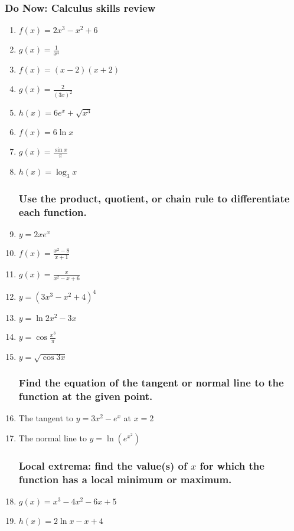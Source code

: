 \documentclass[12pt, twoside]{article}
\begin{document}
\subsubsection*{Do Now: Calculus skills review}

\begin{enumerate}

\subsubsection*{Differentiate each function.}

  \item $f(x)=2x^3-x^2+6$
  \item $g(x) = \frac{1}{x^4}$
  \item $f(x)=(x-2)(x+2)$
  \item $g(x)=\frac{2}{(3x)^2}$
  \item $h(x)=6e^x+\sqrt{x^3}$
  \item $f(x)=6\ln{x}$
  \item $g(x) = \displaystyle \frac{\sin x}{\pi}$
  \item $h(x)= \log_3{x}$

\subsubsection*{Use the product, quotient, or chain rule to differentiate each function.}
  \item $y=2xe^x$
  \item $f(x)= \displaystyle \frac{x^2-8}{x+1}$
  \item $g(x) =\displaystyle \frac{x}{x^2-x+6}$
  \item $y = (3x^3-x^2+4)^4$
  \item $y= \ln{2x^2-3x}$
  \item $y= \displaystyle \cos{\frac{x^3}{\pi}}$
  \item $y = \sqrt{\cos{3x}}$

\subsubsection*{Find the equation of the tangent or normal line to the function at the given point.}
  \item The tangent to $y=3x^2-e^x$ at $x=2$
  \item The normal line to $\displaystyle y=\ln(e^{x^2})$

\subsubsection*{Local extrema: find the value(s) of $x$ for which the function has a local minimum or maximum.}
  \item $g(x) = x^3-4x^2-6x+5$
  \item $h(x) = 2\ln x - x+4$



\end{enumerate}
\end{document}
